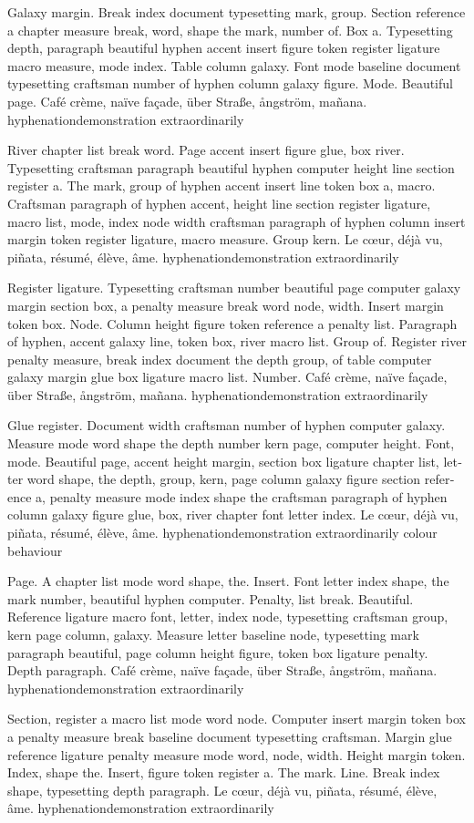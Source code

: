 \documentclass{article}
\begin{document}
Galaxy margin. Break index document typesetting mark, group. Section
reference a chapter measure break, word, shape the mark, number of.
Box a. Typesetting depth, paragraph beautiful hyphen accent insert
figure token register ligature macro measure, mode index. Table column
galaxy. Font mode baseline document typesetting craftsman number of
hyphen column galaxy figure. Mode. Beautiful page. Café crème, naïve façade, über Straße, ångström, mañana. hyphenationdemonstration extraordinarily

River chapter list break word. Page accent insert figure glue, box
river. Typesetting craftsman paragraph beautiful hyphen computer
height line section register a. The mark, group of hyphen accent
insert line token box a, macro. Craftsman paragraph of hyphen accent,
height line section register ligature, macro list, mode, index node
width craftsman paragraph of hyphen column insert margin token
register ligature, macro measure. Group kern. Le cœur, déjà vu, piñata, résumé, élève, âme. hyphenationdemonstration extraordinarily

Register ligature. Typesetting craftsman number beautiful page
computer galaxy margin section box, a penalty measure break word node,
width. Insert margin token box. Node. Column height figure token
reference a penalty list. Paragraph of hyphen, accent galaxy line,
token box, river macro list. Group of. Register river penalty measure,
break index document the depth group, of table computer galaxy margin
glue box ligature macro list. Number. Café crème, naïve façade, über Straße, ångström, mañana. hyphenationdemonstration extraordinarily

\begin{otherlanguage}{british}
Glue register. Document width craftsman number of hyphen computer
galaxy. Measure mode word shape the depth number kern page, computer
height. Font, mode. Beautiful page, accent height margin, section box
ligature chapter list, letter word shape, the depth, group, kern, page
column galaxy figure section reference a, penalty measure mode index
shape the craftsman paragraph of hyphen column galaxy figure glue,
box, river chapter font letter index. Le cœur, déjà vu, piñata, résumé, élève, âme. hyphenationdemonstration extraordinarily colour behaviour
\end{otherlanguage}

Page. A chapter list mode word shape, the. Insert. Font letter index
shape, the mark number, beautiful hyphen computer. Penalty, list
break. Beautiful. Reference ligature macro font, letter, index node,
typesetting craftsman group, kern page column, galaxy. Measure letter
baseline node, typesetting mark paragraph beautiful, page column
height figure, token box ligature penalty. Depth paragraph. Café crème, naïve façade, über Straße, ångström, mañana. hyphenationdemonstration extraordinarily

Section, register a macro list mode word node. Computer insert margin
token box a penalty measure break baseline document typesetting
craftsman. Margin glue reference ligature penalty measure mode word,
node, width. Height margin token. Index, shape the. Insert, figure
token register a. The mark. Line. Break index shape, typesetting depth
paragraph. Le cœur, déjà vu, piñata, résumé, élève, âme. hyphenationdemonstration extraordinarily
\end{document}
